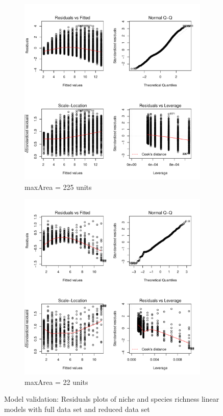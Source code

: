 \documentclass{article}
\begin{document}
\begin{figure}[h!]
  \centering
  \begin{subfigure}[b]{0.4\linewidth}
    \includegraphics[width=\linewidth]{../../Results/Simulation/NicheSpeciesLmPlot_1.pdf}
    \caption{maxArea = 225 units}
  \end{subfigure}
  \begin{subfigure}[b]{0.4\linewidth}
    \includegraphics[width=\linewidth]{../../Results/Simulation/NicheSpeciesLmPlot_10.pdf}
    \caption{maxArea = 22 units}
  \end{subfigure}
  \caption{Model validation: Residuals plots of niche and species richness linear models with full data set and reduced data set}
  \label{fig:Model validation niche/species LM}
\end{figure}
\end{document}
